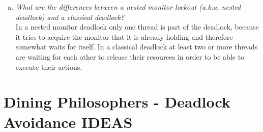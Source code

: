 \documentclass{report}
\begin{document}
\begin{enumerate}[a)]
			\item \textit{What are the differences between a nested monitor lockout (a.k.a. nested deadlock) and a classical deadlock?} \\
			In a nested monitor deadlock only one thread is part of the deadlock, because it tries to acquire the monitor that it is already holding and therefore somewhat waits for itself. In a classical deadlock at least two or more threads are waiting for each other to release their resources in order to be able to execute their actions.
		\end{enumerate}
	\closesection
	
	\section{Dining Philosophers - Deadlock Avoidance IDEAS}
	\startsection
\end{document}
